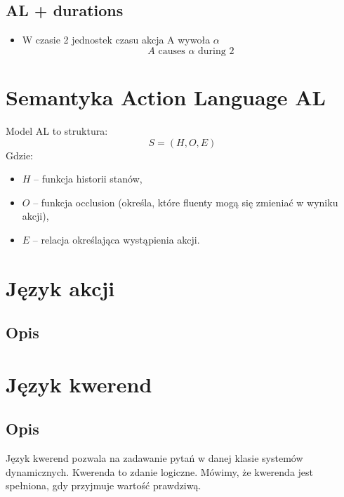\documentclass{article}
\begin{document}
\subsection{AL + durations} 
\begin{itemize}
    \item W czasie 2 jednostek czasu akcja A wywoła $\alpha$
    \begin{equation}
        A \text{ causes } \alpha \text{ during 2} 
    \end{equation}
\end{itemize}

\section{Semantyka Action Language AL}
Model AL to struktura:
\begin{equation}
    S = (H, O, E)
\end{equation}
Gdzie:
\begin{itemize}
    \item $H$ – funkcja historii stanów,
    \item $O$ – funkcja occlusion (określa, które fluenty mogą się zmieniać w wyniku akcji),
    \item $E$ – relacja określająca wystąpienia akcji.
\end{itemize}

\section{Język akcji}

\subsection{Opis}


\section{Język kwerend}

\subsection{Opis}
Język kwerend pozwala na zadawanie pytań w danej klasie systemów dynamicznych. Kwerenda to zdanie logiczne. Mówimy, że kwerenda jest spełniona, gdy przyjmuje wartość prawdziwą.
\end{document}
